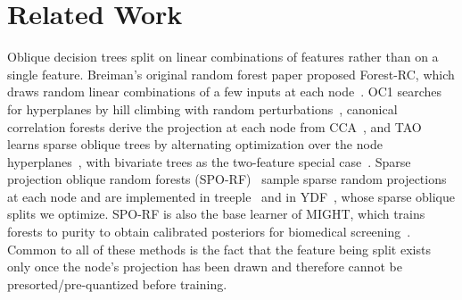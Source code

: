 \documentclass[sigconf,anonymous,review]{acmart}
\begin{document}








\section{Related Work}

Oblique decision trees split on linear combinations of features rather than on a single feature. Breiman's original random forest paper proposed Forest-RC, which draws random linear combinations of a few inputs at each node~\cite{breiman}. OC1 searches for hyperplanes by hill climbing with random perturbations~\cite{murthy1994system}, canonical correlation forests derive the projection at each node from CCA~\cite{rainforth2015canonical}, and TAO learns sparse oblique trees by alternating optimization over the node hyperplanes~\cite{carreira2018alternating}, with bivariate trees as the two-feature special case~\cite{kairgeldin_bivariate_2024}. Sparse projection oblique random forests (SPO-RF)~\cite{tomita2020sparse} sample sparse random projections at each node and are implemented in treeple~\cite{treeple} and in YDF~\cite{ydf}, whose sparse oblique splits we optimize. SPO-RF is also the base learner of MIGHT, which trains forests to purity to obtain calibrated posteriors for biomedical screening~\cite{might1,might2}. Common to all of these methods is the fact that the feature being split exists only once the node's projection has been drawn and therefore cannot be presorted/pre-quantized before training.
\end{document}
